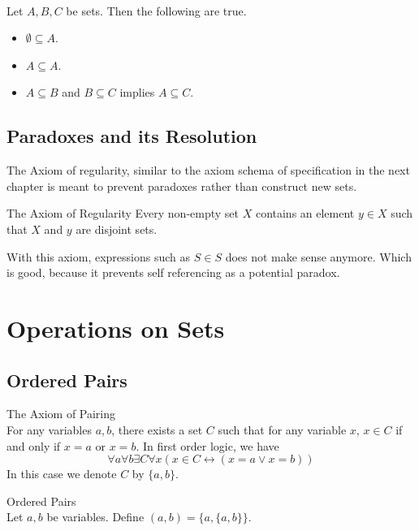 \documentclass[a4paper]{article}
\begin{document}
\begin{lmm}{}{}\\
Let $A,B,C$ be sets. Then the following are true. 
\begin{itemize}
\item $\emptyset\subseteq A$. 
\item $A\subseteq A$. 
\item $A\subseteq B$ and $B\subseteq C$ implies $A\subseteq C$. 
\end{itemize}
\end{lmm}
\subsection{Paradoxes and its Resolution}
The Axiom of regularity, similar to the axiom schema of specification in the next chapter is meant to prevent paradoxes rather than construct new sets. 

\begin{axm}{The Axiom of Regularity}{} Every non-empty set $X$ contains an element $y\in X$ such that $X$ and $y$ are disjoint sets. 
\end{axm}

With this axiom, expressions such as $S\in S$ does not make sense anymore. Which is good, because it prevents self referencing as a potential paradox. 

\pagebreak
\section{Operations on Sets}
\subsection{Ordered Pairs}
\begin{axm}{The Axiom of Pairing}{}\\
For any variables $a,b$, there exists a set $C$ such that for any variable $x$, $x\in C$ if and only if $x=a$ or $x=b$. In first order logic, we have $$\forall a\forall b\exists C\forall x(x\in C\leftrightarrow(x=a\vee x=b))$$ In this case we denote $C$ by $\{a,b\}$. 
\end{axm}

\begin{defn}{Ordered Pairs}{}\\
Let $a,b$ be variables. Define $(a,b)=\{a,\{a,b\}\}$. 
\end{defn}
\end{document}
